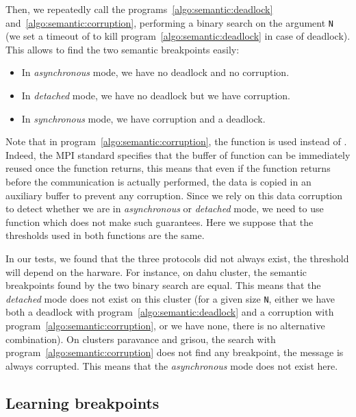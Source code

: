            Then, we repeatedly call the programs~\ref{algo:semantic:deadlock} and~\ref{algo:semantic:corruption},
            performing a binary search on the argument \texttt{N} (we set a timeout of  to kill
            program~\ref{algo:semantic:deadlock} in case of deadlock). This allows to find the two semantic breakpoints
            easily:
            \begin{itemize}
                \item In \emph{asynchronous} mode, we have no deadlock and no corruption.
                \item In \emph{detached} mode, we have no deadlock but we have corruption.
                \item In \emph{synchronous} mode, we have corruption and a deadlock.
            \end{itemize}

            Note that in program~\ref{algo:semantic:corruption}, the function \isend is used instead of \send. Indeed,
            the MPI standard specifies that the buffer of function \send can be immediately reused once the function
            returns, this means that even if the function returns before the communication is actually performed, the
            data is copied in an auxiliary buffer to prevent any corruption. Since we rely on this data corruption to
            detect whether we are in \emph{asynchronous} or \emph{detached} mode, we need to use function \isend which
            does not make such guarantees. Here we suppose that the thresholds used in both functions are the same.

            In our tests, we found that the three protocols did not always exist, the threshold will depend on the
            harware. For instance, on dahu cluster, the semantic breakpoints found by the two binary search are equal.
            This means that the \emph{detached} mode does not exist on this cluster (for a given size \texttt{N}, either
            we have both a deadlock with program~\ref{algo:semantic:deadlock} and a corruption with
            program~\ref{algo:semantic:corruption}, or we have none, there is no alternative combination).
            On clusters paravance and grisou, the search with program~\ref{algo:semantic:corruption} does not find any
            breakpoint, the message is always corrupted. This means that the \emph{asynchronous} mode does not exist
            here.

        \subsection{Learning breakpoints}%
        \label{sub:pycewise}

